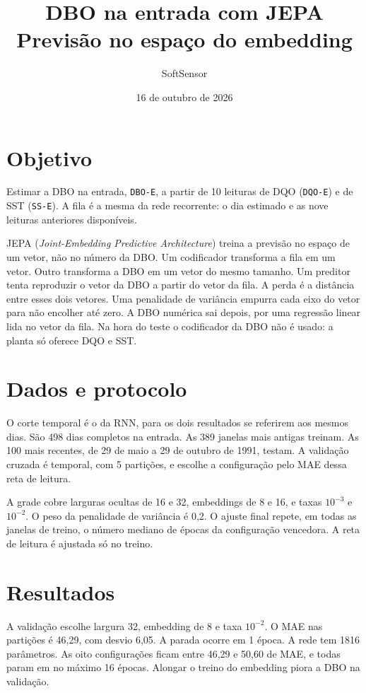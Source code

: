\documentclass[11pt,a4paper]{article}
\title{DBO na entrada com JEPA\\[0.3em]
\large Previsão no espaço do embedding}
\author{SoftSensor}
\date{16 de outubro de 2026}
\begin{document}
\maketitle

\section{Objetivo}

Estimar a DBO na entrada, \texttt{DBO-E}, a partir de 10 leituras de DQO (\texttt{DQO-E}) e de SST (\texttt{SS-E}). A fila é a mesma da rede recorrente: o dia estimado e as nove leituras anteriores disponíveis.

JEPA (\emph{Joint-Embedding Predictive Architecture}) treina a previsão no espaço de um vetor, não no número da DBO. Um codificador transforma a fila em um vetor. Outro transforma a DBO em um vetor do mesmo tamanho. Um preditor tenta reproduzir o vetor da DBO a partir do vetor da fila. A perda é a distância entre esses dois vetores. Uma penalidade de variância empurra cada eixo do vetor para não encolher até zero. A DBO numérica sai depois, por uma regressão linear lida no vetor da fila. Na hora do teste o codificador da DBO não é usado: a planta só oferece DQO e SST.

\section{Dados e protocolo}

O corte temporal é o da RNN, para os dois resultados se referirem aos mesmos dias. São 498 dias completos na entrada. As 389 janelas mais antigas treinam. As 100 mais recentes, de 29 de maio a 29 de outubro de 1991, testam. A validação cruzada é temporal, com 5 partições, e escolhe a configuração pelo MAE dessa reta de leitura.

A grade cobre larguras ocultas de 16 e 32, embeddings de 8 e 16, e taxas \(10^{-3}\) e \(10^{-2}\). O peso da penalidade de variância é 0,2. O ajuste final repete, em todas as janelas de treino, o número mediano de épocas da configuração vencedora. A reta de leitura é ajustada só no treino.

\section{Resultados}

A validação escolhe largura 32, embedding de 8 e taxa \(10^{-2}\). O MAE nas partições é 46,29, com desvio 6,05. A parada ocorre em 1 época. A rede tem 1816 parâmetros. As oito configurações ficam entre 46,29 e 50,60 de MAE, e todas param em no máximo 16 épocas. Alongar o treino do embedding piora a DBO na validação.
\end{document}
